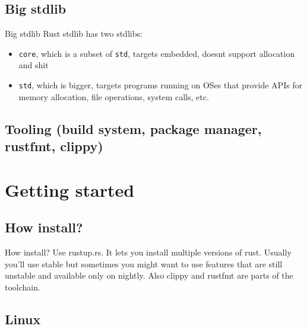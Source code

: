 \documentclass[
  9pt,
  ignorenonframetext,
]{beamer}
\newcommand{\passthrough}[1]{#1}
\providecommand{\tightlist}{%
  \setlength{\itemsep}{0pt}\setlength{\parskip}{0pt}}
\begin{document}
\hypertarget{big-stdlib}{%
\subsection{Big stdlib}\label{big-stdlib}}

\begin{frame}[fragile]{Big stdlib}
Rust stdlib has two stdlibs:

\begin{itemize}
\tightlist
\item
  \passthrough{\lstinline!core!}, which is a subset of
  \passthrough{\lstinline!std!}, targets embedded, doesnt support
  allocation and shit
\item
  \passthrough{\lstinline!std!}, which is bigger, targets programs
  running on OSes that provide APIs for memory allocation, file
  operations, system calls, etc.
\end{itemize}
\end{frame}

\hypertarget{tooling-build-system-package-manager-rustfmt-clippy}{%
\subsection{Tooling (build system, package manager, rustfmt,
clippy)}\label{tooling-build-system-package-manager-rustfmt-clippy}}

\hypertarget{getting-started}{%
\section{Getting started}\label{getting-started}}

\hypertarget{how-install}{%
\subsection{How install?}\label{how-install}}

\begin{frame}{How install?}
Use rustup.rs. It lets you install multiple versions of rust. Usually
you'll use stable but sometimes you might want to use features that are
still unstable and available only on nightly. Also clippy and rustfmt
are parts of the toolchain.
\end{frame}

\hypertarget{linux}{%
\subsection{Linux}\label{linux}}
\end{document}
